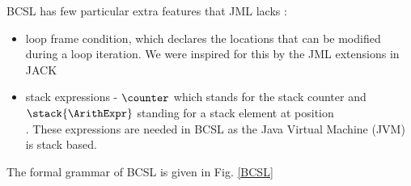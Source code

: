 BCSL has few particular extra features that JML lacks :
\begin{itemize}
   \item loop frame condition, which declares the locations
that can be modified during a loop iteration. We were inspired for this by the JML extensions in JACK ~\cite{BRL-JACK}

   \item stack expressions - $\counter$ which stands for the stack counter and \\
 $\stack{\ArithExpr}$ standing for a stack element at position \\
\ArithExpr. These expressions are needed in BCSL as the Java Virtual Machine (JVM) is
stack based.


\end{itemize}

The formal grammar of BCSL is given in Fig. \ref{BCSL}


